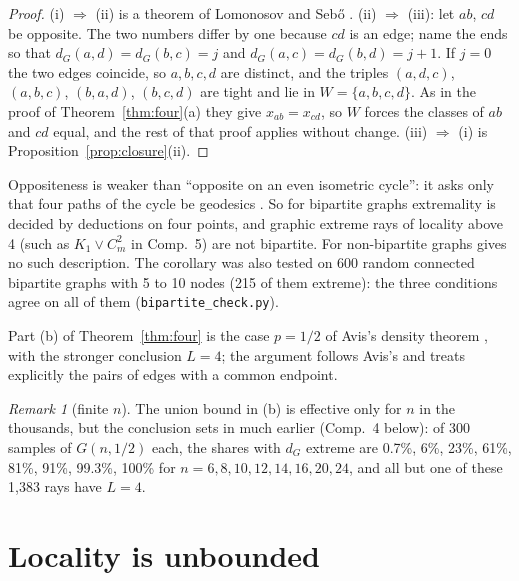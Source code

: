 \documentclass[11pt,a4paper]{article}
\theoremstyle{definition}
\theoremstyle{remark}
\newtheorem*{remark}{Remark}
\newcommand{\file}[1]{\texttt{#1}}
\begin{document}
\begin{proof}
(i) $\Rightarrow$ (ii) is a theorem of Lomonosov and Seb\H{o} \cite[Corollary 1(c) of Theorem 5]{LS93}.
(ii) $\Rightarrow$ (iii): let $ab$, $cd$ be opposite. The two numbers differ by one because $cd$ is an edge; name the
ends so that $d_G(a, d) = d_G(b, c) = j$ and $d_G(a, c) = d_G(b, d) = j + 1$. If $j = 0$ the two edges coincide, so
$a, b, c, d$ are distinct, and the triples $(a, d, c)$, $(a, b, c)$, $(b, a, d)$, $(b, c, d)$ are tight and lie in
$W = \{a, b, c, d\}$. As in the proof of Theorem~\ref{thm:four}(a) they give $x_{ab} = x_{cd}$, so $W$ forces the
classes of $ab$ and $cd$ equal, and the rest of that proof applies without change. (iii) $\Rightarrow$ (i) is
Proposition~\ref{prop:closure}(ii).
\end{proof}

Oppositeness is weaker than ``opposite on an even isometric cycle'': it asks only that four paths of the cycle be
geodesics \cite[p.~223]{LS93}. So for bipartite graphs extremality is decided by deductions on four points, and
graphic extreme rays of locality above 4 (such as $K_1 \vee C_m^2$ in Comp.~5) are not bipartite. For non-bipartite
graphs \cite{LS93} gives no such description. The corollary was also tested on 600 random connected bipartite graphs
with 5 to 10 nodes (215 of them extreme): the three conditions agree on all of them
(\file{bipartite\_check.py}).

Part (b) of Theorem~\ref{thm:four} is the case $p = 1/2$ of Avis's density theorem \cite[Thm 3.3]{A80}, with the stronger conclusion $L = 4$;
the argument follows Avis's and treats explicitly the pairs of edges with a common endpoint.

\begin{remark}[finite $n$]
The union bound in (b) is effective only for $n$ in the thousands, but the conclusion sets in much earlier (Comp.~4
below): of 300 samples of $G(n, 1/2)$ each, the shares with $d_G$ extreme are 0.7\%, 6\%, 23\%, 61\%, 81\%, 91\%,
99.3\%, 100\% for $n = 6, 8, 10, 12, 14, 16, 20, 24$, and all but one of these 1,383 rays have $L = 4$.
\end{remark}

\section{Locality is unbounded}\label{sec:main}
\end{document}
